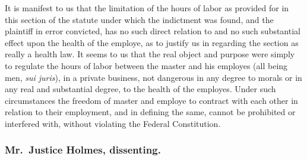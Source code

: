 \documentclass[
  letterpaper,
  11pt,
  DIV=9,
  openright]{scrbook}
\begin{document}
It is manifest to us that the limitation of the hours of labor as
provided for in this section of the statute under which the indictment
was found, and the plaintiff in error convicted, has no such direct
relation to and no such substantial effect upon the health of the
employe, as to justify us in regarding the section as really a health
law. It seems to us that the real object and purpose were simply to
regulate the hours of labor between the master and his employes (all
being men, \emph{sui juris}), in a private business, not dangerous in
any degree to morals or in any real and substantial degree, to the
health of the employes. Under such circumstances the freedom of master
and employe to contract with each other in relation to their employment,
and in defining the same, cannot be prohibited or interfered with,
without violating the Federal Constitution.

\subsubsection{Mr.~Justice Holmes,
dissenting.}\label{mr.-justice-holmes-dissenting.}
\end{document}
